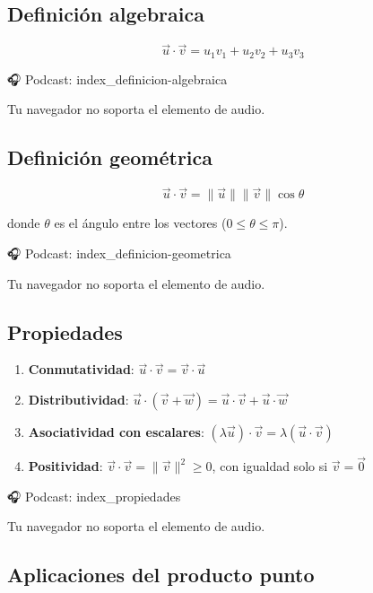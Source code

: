\documentclass[
]{book}
\providecommand{\tightlist}{%
  \setlength{\itemsep}{0pt}\setlength{\parskip}{0pt}}
\begin{document}
\subsection{Definición algebraica}\label{definiciuxf3n-algebraica}

\[
\vec{u} \cdot \vec{v} = u_1 v_1 + u_2 v_2 + u_3 v_3
\]

🎧 Podcast: index\_definicion-algebraica

Tu navegador no soporta el elemento de audio.

\subsection{Definición geométrica}\label{definiciuxf3n-geomuxe9trica}

\[
\vec{u} \cdot \vec{v} = \|\vec{u}\| \|\vec{v}\| \cos\theta
\]

donde \(\theta\) es el ángulo entre los vectores (\(0 \leq \theta \leq \pi\)).

🎧 Podcast: index\_definicion-geometrica

Tu navegador no soporta el elemento de audio.

\subsection{Propiedades}\label{propiedades}

\begin{enumerate}
\def\labelenumi{\arabic{enumi}.}
\tightlist
\item
  \textbf{Conmutatividad}: \(\vec{u} \cdot \vec{v} = \vec{v} \cdot \vec{u}\)
\item
  \textbf{Distributividad}: \(\vec{u} \cdot (\vec{v} + \vec{w}) = \vec{u} \cdot \vec{v} + \vec{u} \cdot \vec{w}\)
\item
  \textbf{Asociatividad con escalares}: \((\lambda \vec{u}) \cdot \vec{v} = \lambda (\vec{u} \cdot \vec{v})\)
\item
  \textbf{Positividad}: \(\vec{v} \cdot \vec{v} = \|\vec{v}\|^2 \geq 0\), con igualdad solo si \(\vec{v} = \vec{0}\)
\end{enumerate}

🎧 Podcast: index\_propiedades

Tu navegador no soporta el elemento de audio.

\subsection{Aplicaciones del producto punto}\label{aplicaciones-del-producto-punto}
\end{document}
